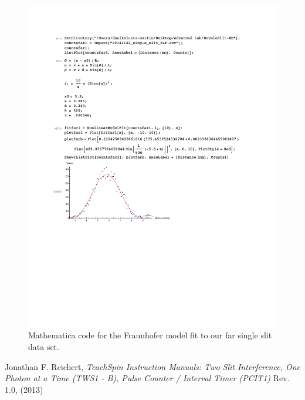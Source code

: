 \documentclass[prb,preprint]{revtex4-1}
\begin{document}
\begin{figure}[h!]
\centering
\includegraphics[width=6in]{SingleFarFraun.pdf}
\caption{Mathematica code for the Fraunhofer model fit to our far single slit data set.}
\label{SingleFarFraun}
\end{figure}


\begin{thebibliography}{1}

 Jonathan F. Reichert, \textit{TeachSpin Instruction Manuals: Two-Slit Interference, One Photon at a Time (TWS1 - B), Pulse Counter / Interval Timer (PCIT1)} Rev. 1.0, (2013)

\end{thebibliography}
\end{document}

